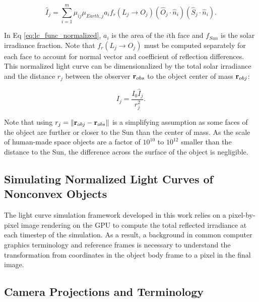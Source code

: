 \begin{equation} \label{eq:lc_func_normalized}
  \hat{I}_{j} = \sum_{i=1}^{m}{\mu_{ij} \mu_{Earth,j} a_i f_r(L_j \rightarrow O_j) \left( \hat{O}_j \cdot \hat{n}_i \right) \left( \hat{S}_j \cdot \hat{n}_i \right)}.
\end{equation}

In Eq \ref{eq:lc_func_normalized}, $a_i$ is the area of the $i$th face and $f_{Sun}$ is the solar irradiance fraction. Note that $f_r(L_j \rightarrow O_j)$ must be computed separately for each face to account for normal vector and coefficient of reflection differences. This normalized light curve can be dimensionalized by the total solar irradiance and the distance $r_j$ between the observer $\mathbf{r}_{obs}$ to the object center of mass $\mathbf{r}_{obj}$:

\begin{equation} \label{eq:lc_func_norm_to_irrad}
  I_{j} = \frac{I_0 \hat{I}_j}{r_j^2}.
\end{equation}

Note that using $r_j = \| \mathbf{r}_{obj} - \mathbf{r}_{obs} \|$ is a simplifying assumption as some faces of the object are further or closer to the Sun than the center of mass. As the scale of human-made space objects are a factor of $10^{10}$ to $10^{12}$ smaller than the distance to the Sun, the difference across the surface of the object is negligible.


\subsection{Simulating Normalized Light Curves of Nonconvex Objects}

The light curve simulation framework developed in this work relies on a pixel-by-pixel image rendering on the GPU to compute the total reflected irradiance at each timestep of the simulation. As a result, a background in common computer graphics terminology and reference frames is necessary to understand the transformation from coordinates in the object body frame to a pixel in the final image.

\subsection{Camera Projections and Terminology}

